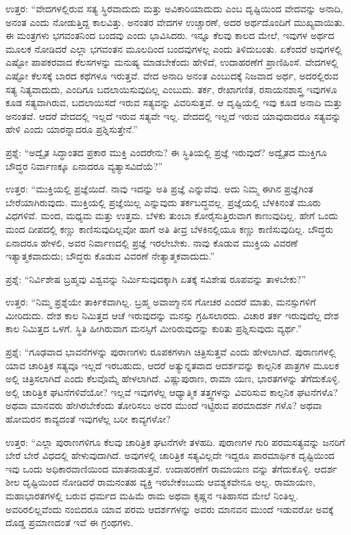 ಉತ್ತರ: “ವೇದಗಳಲ್ಲಿರುವ ಸತ್ಯ ಸ್ಥಿರವಾದುದು ಮತ್ತು ಅವಿಕಾರಿಯಾದುದು ಎಂಬ ದೃಷ್ಟಿಯಿಂದ ವೇದವನ್ನು ಅನಾದಿ, ಅನಂತ ಎಂದು ನೋಡುತ್ತಿದ್ದ ಕಾಲವಿತ್ತು. ಅನಂತರ ವೇದಗಳ ಉಚ್ಚಾರಣೆ, ಅದರ ಅರ್ಥದೊಂದಿಗೆ ಮುಖ್ಯವಾಯಿತು. ಈ ಮಂತ್ರಗಳು ಭಗವಂತನಿಂದ ಬಂದವು ಎಂದು ಭಾವಿಸಿದರು. ಇನ್ನೂ ಕೆಲವು ಕಾಲದ ಮೇಲೆ, ಇವುಗಳ ಅರ್ಥದ ಮೂಲಕ ನೋಡಿದರೆ ಎಲ್ಲಾ ಭಗವಂತನ ಮೂಲದಿಂದ ಬಂದವುಗಳಲ್ಲ ಎಂದು ತಿಳಿದುಬಂತು. ಏಕೆಂದರೆ ಅವುಗಳಲ್ಲಿ ಎಷ್ಟೋ ಪಾಪಕರವಾದ ಕೆಲಸಗಳನ್ನು ಮನುಷ್ಯ ಮಾಡಬೇಕೆಂದು ಹೇಳಿದೆ, ಉದಾಹರಣೆಗೆ ಪ್ರಾಣಿಹಿಂಸೆ. ವೇದಗಳಲ್ಲಿ ಎಷ್ಟೋ ಕೆಲಸಕ್ಕೆ ಬಾರದ ಕಥೆಗಳೂ ಇರುತ್ತವೆ. ವೇದ ಅನಾದಿ ಅನಂತ ಎಂಬುದಕ್ಕೆ ನಿಜವಾದ ಅರ್ಥ, ಅದರಲ್ಲಿರುವ ಸತ್ಯ ನಿತ್ಯವಾದುದು, ಎಂದಿಗೂ ಬದಲಾಯಿಸುವುದಿಲ್ಲ ಎಂಬುದು. ತರ್ಕ, ರೇಖಾಗಣಿತ, ರಸಾಯನಶಾಸ್ತ್ರ ಇವುಗಳೂ ಕೂಡ ಸತ್ಯವಾಗಿರುವ, ಬದಲಾಯಿಸದೆ ಇರುವ ಸತ್ಯವನ್ನು ವಿವರಿಸುತ್ತವೆ. ಆ ದೃಷ್ಟಿಯಲ್ಲಿ ಇವು ಕೂಡ ಅನಾದಿ ಮತ್ತು ಅನಂತವೆ. ಆದರೆ ವೇದದಲ್ಲಿ ಇಲ್ಲದೆ ಇರುವ ಸತ್ಯವೇ ಇಲ್ಲ. ವೇದದಲ್ಲಿ ಇಲ್ಲದೆ ಇರುವ ಯಾವುದಾದರೂ ಸತ್ಯವನ್ನು ಹೇಳಿ ಎಂದು ಯಾರನ್ನಾದರೂ ಪ್ರಶ್ನಿಸುತ್ತೇನೆ.”

ಪ್ರಶ್ನೆ: “ಅದ್ವೈತ ಸಿದ್ಧಾಂತದ ಪ್ರಕಾರ ಮುಕ್ತಿ ಎಂದರೇನು? ಈ ಸ್ಥಿತಿಯಲ್ಲಿ ಪ್ರಜ್ಞೆ ಇರುವುದೆ? ಅದ್ವೈತದ ಮುಕ್ತಿಗೂ ಬೌದ್ಧರ ನಿರ್ವಾಣಕ್ಕೂ ಏನಾದರೂ ವ್ಯತ್ಯಾಸವಿದೆಯೆ?”

ಉತ್ತರ: “ಮುಕ್ತಿಯಲ್ಲಿ ಪ್ರಜ್ಞೆಯಿದೆ. ನಾವು ಇದನ್ನು ಅತಿ ಪ್ರಜ್ಞೆ ಎನ್ನುವೆವು. ಅದು ನಿಮ್ಮ ಈಗಿನ ಪ್ರಜ್ಞೆಗಿಂತ ಬೇರೆಯಾಗಿರುವುದು. ಮುಕ್ತಿಯಲ್ಲಿ ಪ್ರಜ್ಞೆಯಿಲ್ಲ ಎನ್ನುವುದು ತರ್ಕಬದ್ಧವಲ್ಲ. ಪ್ರಜ್ಞೆಯಲ್ಲಿ ಬೆಳಕಿನಂತೆ ಮೂರು ವಿಧಗಳಿವೆ. ಮಂದ, ಮಧ್ಯಮ ಮತ್ತು ಉತ್ತಮ. ಬೆಳಕು ತುಂಬಾ ಕೋರೈಸುತ್ತಿರುವಾಗ ಕಾಣುವುದಿಲ್ಲ. ಹೇಗೆ ಒಂದು ಮಂದ ದೀಪದಲ್ಲಿ ಕಣ್ಣು ಕಾಣಿಸುವುದಿಲ್ಲವೋ ಹಾಗೆ ಅತಿ ತೀವ್ರ ಬೆಳಕಿನಲ್ಲಿಯೂ ಕಣ್ಣು ಕಾಣಿಸುವುದಿಲ್ಲ. ಬೌದ್ಧರು ಏನಾದರೂ ಹೇಳಲಿ, ಅವರ ನಿರ್ವಾಣದಲ್ಲಿ ಪ್ರಜ್ಞೆ ಇರಲೇಬೇಕು. ನಾವು ಕೊಡುವ ಮುಕ್ತಿಯ ವಿವರಣೆ ಇತ್ಯಾತ್ಮಕವಾದುದು; ಬೌದ್ಧರು ಕೊಡುವ ವಿವರಣೆ ನೇತ್ಯಾತ್ಮಕವಾದುದು.”

ಪ್ರಶ್ನೆ: “ನಿರ್ವಿಶೇಷ ಬ್ರಹ್ಮವು ವಿಶ್ವವನ್ನು ನಿರ್ಮಿಸುವುದಕ್ಕಾಗಿ ಏತಕ್ಕೆ ಸವಿಶೇಷ ರೂಪವನ್ನು ತಾಳಬೇಕು?”

ಉತ್ತರ: “ನಿಮ್ಮ ಪ್ರಶ್ನೆಯೇ ತಾರ್ಕಿಕವಾಗಿಲ್ಲ. ಬ್ರಹ್ಮ ಅವಾಙ್ಮಾನಸ ಗೋಚರ ಎಂದರೆ ಮಾತು, ಮನಸ್ಸುಗಳಿಗೆ ಮೀರಿದುದು. ದೇಶ ಕಾಲ ನಿಮಿತ್ತದ ಆಚೆ ಇರುವುದನ್ನು ಮನಸ್ಸು ಗ್ರಹಿಸಲಾರದು. ವಿಚಾರ ತರ್ಕ ಇರುವುದೆಲ್ಲ ದೇಶ ಕಾಲ ನಿಮಿತ್ತದ ಒಳಗೆ. ಸ್ಥಿತಿ ಹೀಗಿರುವಾಗ ಮನಸ್ಸಿಗೆ ಮೀರಿರುವುದನ್ನು ಕುರಿತು ಪ್ರಶ್ನಿಸುವುದು ವ್ಯರ್ಥ.”

ಪ್ರಶ್ನೆ: “ಗೂಢವಾದ ಭಾವನೆಗಳನ್ನು ಪುರಾಣಗಳು ರೂಪಕಗಳಾಗಿ ಚಿತ್ರಿಸುತ್ತವೆ ಎಂದು ಹೇಳಲಾಗಿದೆ. ಪುರಾಣಗಳಲ್ಲಿ ಯಾವ ಚಾರಿತ್ರಿಕ ಸತ್ಯವೂ ಇಲ್ಲದೆ ಇರಬಹುದು, ಆದರೆ ಅತ್ಯುನ್ನತವಾದ ಆದರ್ಶವನ್ನು ಕಾಲ್ಪನಿಕ ಪಾತ್ರಗಳ ಮೂಲಕ ಅಲ್ಲಿ ಚಿತ್ರಿಸಲಾಗಿದೆ ಎಂದು ಕೆಲವೊಮ್ಮೆ ಹೇಳಲಾಗಿದೆ. ವಿಷ್ಣುಪುರಾಣ, ರಾಮಾ ಯಣ, ಭಾರತಗಳನ್ನು ತೆಗೆದುಕೊಳ್ಳಿ. ಅಲ್ಲಿ ಚಾರಿತ್ರಿಕ ಘಟನೆಗಳಿವೆಯೋ? ಇಲ್ಲವೆ ಇವುಗಳೆಲ್ಲ ಆಧ್ಯಾತ್ಮಿಕ ತತ್ತ್ವಗಳನ್ನು ವಿವರಿಸುವ ಕಾಲ್ಪನಿಕ ಘಟನೆಗಳೊ? ಅಥವಾ ಮಾನವರು ಹೇಗಿರಬೇಕೆಂದು ತೋರಿಸಲು ಅವರ ಮುಂದೆ ಇಟ್ಟಿರುವ ಪರಮಾದರ್ಶ ಗಳೊ? ಅಥವಾ ಹೋಮರನ ಕಾವ್ಯದಂತೆ ಇವುಗಳೆಲ್ಲ ಬರೀ ಕಾವ್ಯಗಳೋ?

ಉತ್ತರ: “ಎಲ್ಲಾ ಪುರಾಣಗಳಿಗೂ ಕೆಲವು ಚಾರಿತ್ರಿಕ ಘಟನೆಗಳೇ ತಳಹದಿ. ಪುರಾಣಗಳ ಗುರಿ ಪರಮಸತ್ಯವನ್ನು ಜನರಿಗೆ ಬೇರೆ ಬೇರೆ ವಿಧದಲ್ಲಿ ಹೇಳುವುದಾಗಿದೆ. ಅವುಗಳಲ್ಲಿ ಚಾರಿತ್ರಿಕ ಸತ್ಯವಿಲ್ಲದೇ ಇದ್ದರೂ ಪಾರಮಾರ್ಥಿಕ ದೃಷ್ಟಿಯಿಂದ ಇವು ಒಂದು ಅಧಿಕಾರವಾಣಿಯಿಂದ ಮಾತನಾಡುತ್ತವೆ. ಉದಾಹರಣೆಗೆ ರಾಮಾಯಣ ವನ್ನು ತೆಗೆದುಕೊಳ್ಳಿ. ಆದರ್ಶ ಶೀಲ ದೃಷ್ಟಿಯಿಂದ ನೋಡಿದರೆ ರಾಮನಂತಹ ವ್ಯಕ್ತಿ ಇರಬೇಕೆಂಬುದು ಆವಶ್ಯಕವೇನೂ ಅಲ್ಲ. ರಾಮಾಯಣ, ಮಹಾಭಾರತಗಳಲ್ಲಿ ಬರುವ ಧರ್ಮದ ಮಹಿಮೆ ರಾಮ ಅಥವಾ ಕೃಷ್ಣನ ಇತಿಹಾಸದ ಮೇಲೆ ನಿಂತಿಲ್ಲ. ಅವರಿರಲಿಲ್ಲವೆಂದು ನಂಬಿದರೂ ಯಾವ ಪರಮ ಆದರ್ಶಗಳನ್ನು ಅವರು ಮಾನವನ ಮುಂದೆ ಇಡುವರೋ ಅವಕ್ಕೆ ದೊಡ್ಡ ಪ್ರಮಾಣದಂತೆ ಇವೆ ಈ ಗ್ರಂಥಗಳು.

